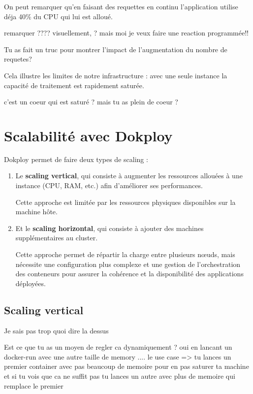 \documentclass{rapportClass} %
\begin{document}
\smallskip
On peut remarquer qu'en faisant des requettes en continu l'application
utilise déja 40\% du CPU qui lui est alloué.

{\color{red} remarquer ???? visuellement, ? mais moi je veux faire une reaction programmée!!}

{\color{red} Tu as fait un truc pour montrer l'impact de l'augmentation du nombre de requetes?}

\smallskip
Cela illustre les limites de notre infrastructure : avec une seule
instance la capacité de traitement est rapidement saturée.

{\color{red} c'est un coeur qui est saturé ? mais tu as plein de coeur ?}



\section{Scalabilité avec Dokploy}
Dokploy permet de faire deux types de scaling : 
\begin{enumerate}
\item Le \textbf{scaling vertical}, qui consiste à augmenter les
  ressources allouées à une instance (CPU, RAM, etc.)  afin
  d'améliorer ses performances.

  Cette approche est limitée par les ressources physiques disponibles
  sur la machine hôte.

\item Et le \textbf{scaling horizontal}, qui consiste à ajouter des
  machines supplémentaires au cluster.

  Cette approche permet de répartir la charge entre plusieurs nœuds,
  mais nécessite une configuration plus complexe et une gestion de
  l'orchestration des conteneurs pour assurer la cohérence et la
  disponibilité des applications déployées.
\end{enumerate}

\subsection{Scaling vertical} 
{\color{blue}Je sais pas trop quoi dire la dessus}

{\color{red} Est ce que tu as un moyen de regler ca dynamiquement ? 
oui en lancant un docker-run avec une autre taille de memory .... le use case  =>  tu lances un premier container avec pas beaucoup de memoire pour en pas saturer ta machine
et si tu vois que ca ne suffit pas tu lances un autre avec plus de memoire qui remplace le premier}
\end{document}
